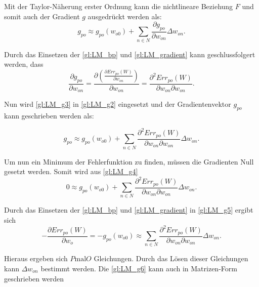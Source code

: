 Mit der Taylor-Näherung erster Ordnung kann die nichtlineare Beziehung $F$ und somit auch der Gradient $g$ ausgedrückt werden als:
\begin{equation}
g_{po} \approx g_{po}(w_{o0}) + \sum\limits_{n \in N} \frac{\partial g_{po}}{\partial w_{on}} \Delta w_{on}.
\label{gl:LM_g2}
\end{equation}

Durch das Einsetzen der \autoref{gl:LM_bp} und \autoref{gl:LM_gradient} kann geschlussfolgert werden, dass
\begin{equation}
\frac{\partial g_{po}}{\partial w_{on}} = \frac{\partial \left ( \frac{\partial Err_{po}(W)}{\partial w_{on}} \right )}{\partial w_{on}} = \frac{\partial^2  Err_{po}(W)}{\partial w_{on} \partial w_{on}}.
\label{gl:LM_g3}
\end{equation}

Nun wird \autoref{gl:LM_g3} in \autoref{gl:LM_g2} eingesetzt und der Gradientenvektor $g_{po}$ kann geschrieben werden als:

\begin{equation}
g_{po} \approx g_{po}(w_{o0}) + \sum\limits_{n \in N} \frac{\partial^2 Err_{po}(W)}{\partial w_{on} \partial w_{on}} \Delta w_{on} .
\label{gl:LM_g4}
\end{equation}

Um nun ein Minimum der Fehlerfunktion zu finden, müssen die Gradienten Null gesetzt werden. Somit wird aus \autoref{gl:LM_g4}
\begin{equation}
0 \approx g_{po}(w_{o0}) + \sum\limits_{n \in N} \frac{\partial^2 Err_{po}(W)}{\partial w_{on} \partial w_{on}} \Delta w_{on} .
\label{gl:LM_g5}
\end{equation}

Durch das Einsetzen der \autoref{gl:LM_bp} und \autoref{gl:LM_gradient} in \autoref{gl:LM_g5} ergibt sich
\begin{equation}
-\frac{\partial Err_{po}(W)}{\partial w_{o}}  = -g_{po}(w_{o0}) \approx \sum\limits_{n \in N} \frac{\partial^2 Err_{po}(W)}{\partial w_{on} \partial w_{on}} \Delta w_{on} .
\label{gl:LM_g6}
\end{equation}

Hieraus ergeben sich $P \text{mal} O$ Gleichungen. Durch das Lösen dieser Gleichungen kann $\Delta w_{on}$ bestimmt werden. Die \autoref{gl:LM_g6} kann auch in Matrizen-Form geschrieben werden

